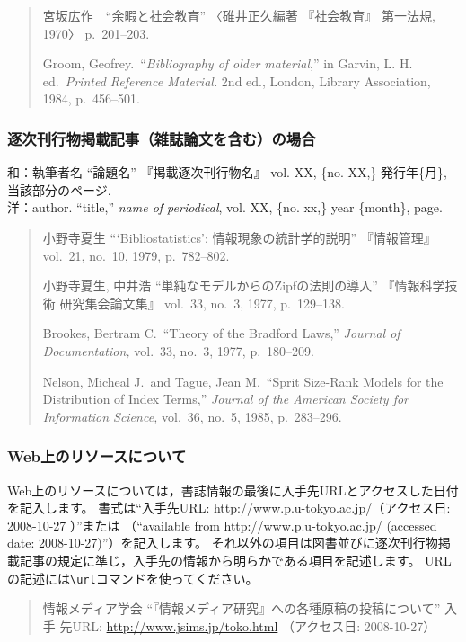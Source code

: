 \documentclass[b5paper,10pt,twocolumn,tombow]{jarticle}
\begin{document}
\begin{quote}
  宮坂広作　``余暇と社会教育'' 〈碓井正久編著 『社会教育』 第一法規,
  1970〉 p.~201--203.

  Groom, Geofrey.\ ``\textit{Bibliography of older material},'' in Garvin,
  L. H. ed.\ \textit{Printed Reference Material.} 2nd ed., London, Library
  Association, 1984, p.~456--501.
\end{quote}


\subsubsection{逐次刊行物掲載記事（雑誌論文を含む）の場合}
\noindent{}和：執筆者名 ``論題名'' 『掲載逐次刊行物名』 vol. XX,
\{no. XX,\} 発行年\{月\}, 当該部分のページ.\\
洋：author. ``title,'' \textit{name of periodical}, vol. XX,
\{no. xx,\} year \{month\}, page.


\begin{quote}
  小野寺夏生 ```Bibliostatistics': 情報現象の統計学的説明'' 『情報管理』
  vol.~21, no.~10, 1979, p.~782--802.

  小野寺夏生, 中井浩 ``単純なモデルからのZipfの法則の導入'' 『情報科学技術
  研究集会論文集』 vol.~33, no.~3, 1977, p.~129--138.

  Brookes, Bertram C.\ ``Theory of the Bradford Laws,'' \textit{Journal of
  Documentation,} vol.~33, no.~3, 1977, p.~180--209.

  Nelson, Micheal J.\ and Tague, Jean M.\ ``Sprit Size-Rank Models for the
  Distribution of Index Terms,'' \textit{Journal of the American Society
  for Information Science,} vol.~36, no.~5, 1985, p.~283--296.
\end{quote}

\subsubsection{Web上のリソースについて}
Web上のリソースについては，書誌情報の最後に入手先URLとアクセスした日付を記入します。
書式は``入手先URL: http://www.p.u-tokyo.ac.jp/（アクセス日: 2008-10-27 ）''または
（``available from http://www.p.u-tokyo.ac.jp/ (accessed date: 2008-10-27)''）を記入します。
それ以外の項目は図書並びに逐次刊行物掲載記事の規定に準じ，入手先の情報から明らかである項目を記述します。
URLの記述には\verb|\url|コマンドを使ってください。

\begin{quote}
  情報メディア学会 ``『情報メディア研究』への各種原稿の投稿について'' 入手
  先URL: \url{http://www.jsims.jp/toko.html} （アクセス日: 2008-10-27）
\end{quote}
\end{document}
